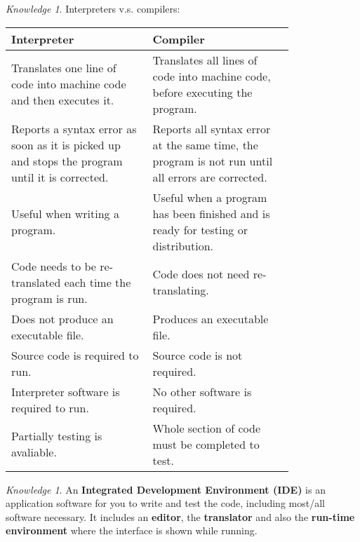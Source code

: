 \documentclass[8pt]{article}
\theoremstyle{remark}
\newtheorem{knowledge}[method]{Knowledge}
\begin{document}
            \begin{knowledge}
                Interpreters v.s. compilers:
                \begin{center}
                    \begin{tabular}{p{0.4\linewidth}|p{0.4\linewidth}}
                        Interpreter & Compiler\\\hline\hline
                        Translates one line of code into machine code and then executes it. & Translates all lines of code into machine code, before executing the program. \\\hline
                        Reports a syntax error as soon as it is picked up and stops the program until it is corrected. & Reports all syntax error at the same time, the program is not run until all errors are corrected. \\\hline
                        Useful when writing a program. & Useful when a program has been finished and is ready for testing or distribution. \\\hline
                        Code needs to be re-translated each time the program is run. & Code does not need re-translating.\\\hline
                        Does not produce an executable file. & Produces an executable file.\\\hline
                        Source code is required to run. & Source code is not required.\\\hline
                        Interpreter software is required to run. & No other software is required.\\\hline
                        Partially testing is avaliable. & Whole section of code must be completed to test.
                    \end{tabular}
                \end{center}
            \end{knowledge}

            \begin{knowledge}
                An \textbf{Integrated Development Environment (IDE)} is an application software for you to write and test the code, including most/all software necessary. It includes an \textbf{editor}, the \textbf{translator} and also the \textbf{run-time environment} where the interface is shown while running.
            \end{knowledge}
\end{document}
